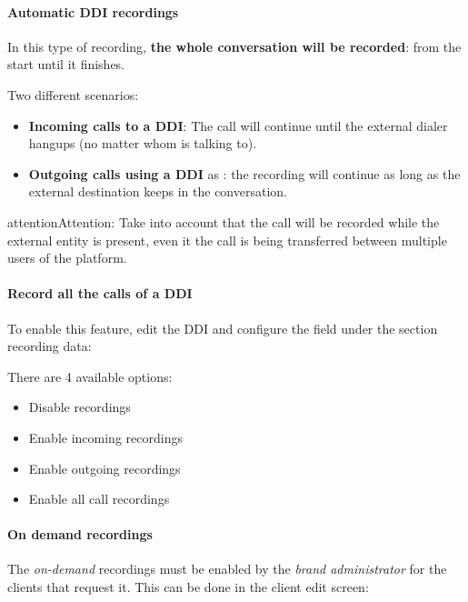 \documentclass[letterpaper,10pt,english]{sphinxmanual}
\begin{document}
\paragraph{Automatic DDI recordings}
\label{administration_portal/client/retail/calls/call_recordings:automatic-ddi-recordings}
In this type of recording, \textbf{the whole conversation will be recorded}: from
the start until it finishes.

Two different scenarios:
\begin{itemize}
\item {} 
\textbf{Incoming calls to a DDI}: The call will continue until the external
dialer hangups (no matter whom is talking to).

\item {} 
\textbf{Outgoing calls using a DDI} as {\hyperref[administration_portal/client/vpbx/ddis:ddis]{}}: the
recording will continue as long as the external destination keeps in the
conversation.

\end{itemize}

\begin{notice}{attention}{Attention:}
Take into account that the call will be recorded while the
external entity is present, even it the call is being transferred between
multiple users of the platform.
\end{notice}
\paragraph{Record all the calls of a DDI}

To enable this feature, edit the DDI and configure the field under the section
recording data:

There are 4 available options:
\begin{itemize}
\item {} 
Disable recordings

\item {} 
Enable incoming recordings

\item {} 
Enable outgoing recordings

\item {} 
Enable all call recordings

\end{itemize}


\paragraph{On demand recordings}
\label{administration_portal/client/retail/calls/call_recordings:on-demand-recordings}
The \emph{on-demand} recordings must be enabled by the \emph{brand administrator} for the
clients that request it. This can be done in the client edit screen:
\end{document}
